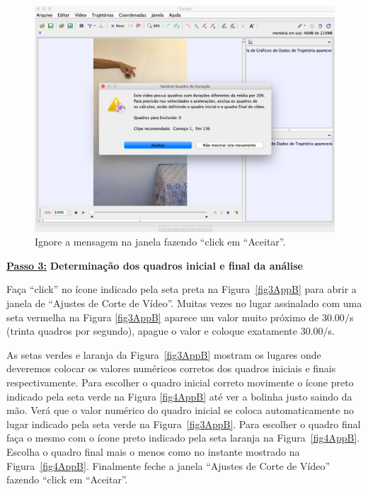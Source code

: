 \begin{minipage}{\linewidth}
\begin{minipage}{0.4\linewidth}
\begin{figure}[H]
              \includegraphics[width=\linewidth]{Figuras_exp3/fig2AppB.pdf}
             \caption{\label{fig2AppB} Ignore a mensagem na janela fazendo ``click em ``Aceitar''.}
          \end{figure}
      \end{minipage}
  \end{minipage}%

\underline{\bf Passo 3:} {\bf Determinação dos quadros inicial e final da análise}\\
\vskip -0.5cm

Faça ``click'' no ícone indicado pela seta preta na Figura~\ref{fig3AppB} para abrir a janela de 
``Ajustes de Corte de Vídeo''. Muitas vezes no lugar assinalado com uma seta vermelha na Figura
\ref{fig3AppB} aparece um valor muito próximo de $30.00/$s (trinta quadros por segundo), apague o valor e coloque exatamente  $30.00/$s.

As setas verdes e laranja da Figura~\ref{fig3AppB} mostram os lugares onde deveremos 
colocar os valores numéricos corretos dos quadros iniciais e finais respectivamente.
Para escolher o quadro inicial correto movimente o ícone preto indicado pela seta verde na Figura 
\ref{fig4AppB} até ver a bolinha justo saindo da mão. Verá que o valor numérico do quadro inicial 
se coloca automaticamente no lugar indicado pela seta verde na Figura~\ref{fig3AppB}. Para escolher 
o quadro final faça o mesmo com o ícone preto indicado pela seta laranja na  Figura~\ref{fig4AppB}. Escolha o quadro final mais o menos como no instante mostrado na  Figura~\ref{fig4AppB}.
Finalmente feche a janela ``Ajustes de Corte de Vídeo'' fazendo ``click em ``Aceitar''.

